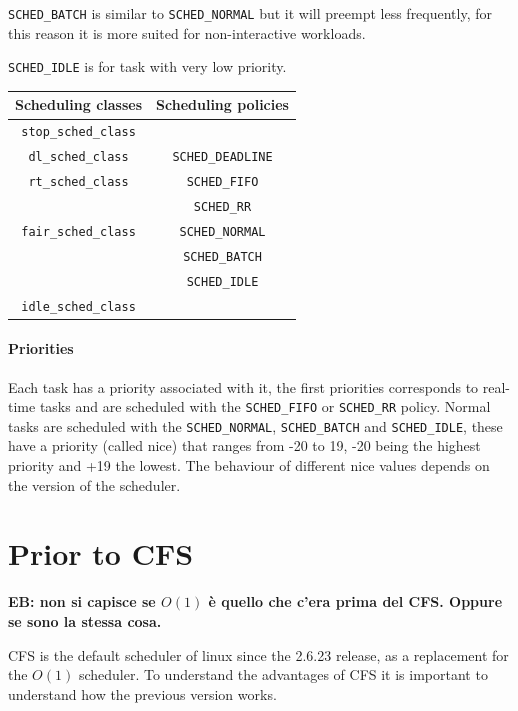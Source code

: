 \documentclass[10pt]{book}
\newcommand{\mycomment}[1]{\textbf{#1}}  %
\begin{document}
\verb|SCHED_BATCH| is similar to \verb|SCHED_NORMAL| but it will preempt less frequently, for this reason it is more suited for non-interactive workloads.

\verb|SCHED_IDLE| is for task with very low priority.

\begin{tabular}{|c|c|}
\hline
\textbf{Scheduling classes} & \textbf{Scheduling policies}\\
\hline
\texttt{stop\_sched\_class} &\\
\hline
\texttt{dl\_sched\_class}   & \texttt{SCHED\_DEADLINE}\\
\hline
\texttt{rt\_sched\_class}   & \texttt{SCHED\_FIFO} \\
                   		   & \texttt{SCHED\_RR}\\
\hline
\texttt{fair\_sched\_class} & \texttt{SCHED\_NORMAL}\\
                   & \texttt{SCHED\_BATCH}\\
                   & \texttt{SCHED\_IDLE}\\
\hline
\texttt{idle\_sched\_class} &\\          
\hline
\end{tabular}


\paragraph{Priorities}
Each task has a priority associated with it, the first priorities corresponds to real-time tasks and are scheduled with the \verb|SCHED_FIFO| or \verb|SCHED_RR| policy. Normal tasks are scheduled with the \verb|SCHED_NORMAL|, \verb|SCHED_BATCH| and \verb|SCHED_IDLE|, these have a priority (called nice) that ranges from -20 to 19, -20 being the highest priority and +19 the lowest. The behaviour of different nice values depends on the version of the scheduler.

\label{sec:cfs}
\section{Prior to CFS}

\mycomment{EB: non si capisce se $O(1)$ \`e quello che c'era prima del
  CFS. Oppure se sono la stessa cosa.}

CFS is the default scheduler of linux since the 2.6.23 release, as a replacement for the $O(1)$ scheduler. To understand the advantages of CFS it is important to understand how the previous version works.
\end{document}
